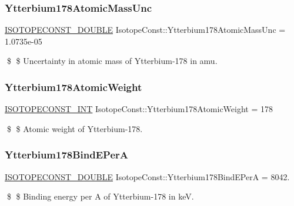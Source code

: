 \subsubsection{\texorpdfstring{Ytterbium178\+Atomic\+Mass\+Unc}{Ytterbium178AtomicMassUnc}}
{\footnotesize\ttfamily \mbox{\hyperlink{group___isotope_const-_macros_ga8f45a7272ce02c0b4c65c44636ed719a}{I\+S\+O\+T\+O\+P\+E\+C\+O\+N\+S\+T\+\_\+\+D\+O\+U\+B\+LE}} Isotope\+Const\+::\+Ytterbium178\+Atomic\+Mass\+Unc = 1.\+0735e-\/05}

\$ \$ Uncertainty in atomic mass of Ytterbium-\/178 in amu. \mbox{\label{group___isotope_const-_ytterbium-_yb178_gac5dc6de9cd400d5db33a45ad57d94533}} 
\subsubsection{\texorpdfstring{Ytterbium178\+Atomic\+Weight}{Ytterbium178AtomicWeight}}
{\footnotesize\ttfamily \mbox{\hyperlink{group___isotope_const-_macros_ga5f18360b3e99483a35c32d789e62621c}{I\+S\+O\+T\+O\+P\+E\+C\+O\+N\+S\+T\+\_\+\+I\+NT}} Isotope\+Const\+::\+Ytterbium178\+Atomic\+Weight = 178}

\$ \$ Atomic weight of Ytterbium-\/178. \mbox{\label{group___isotope_const-_ytterbium-_yb178_gac83bc10974d7f052734708bc79274607}} 
\subsubsection{\texorpdfstring{Ytterbium178\+Bind\+E\+PerA}{Ytterbium178BindEPerA}}
{\footnotesize\ttfamily \mbox{\hyperlink{group___isotope_const-_macros_ga8f45a7272ce02c0b4c65c44636ed719a}{I\+S\+O\+T\+O\+P\+E\+C\+O\+N\+S\+T\+\_\+\+D\+O\+U\+B\+LE}} Isotope\+Const\+::\+Ytterbium178\+Bind\+E\+PerA = 8042.}

\$ \$ Binding energy per A of Ytterbium-\/178 in keV. \mbox{\label{group___isotope_const-_ytterbium-_yb178_ga78150dca59f2bbe4545d9c750734c573}} 
